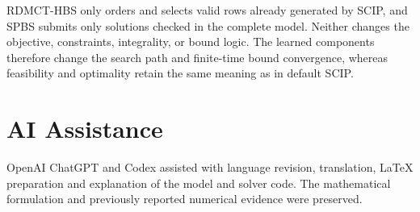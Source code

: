 \documentclass[journal]{IEEEtran}
\newcommand{\method}{RDMCT-HBS}
\begin{document}
\method{} only orders and selects valid rows already generated by SCIP, and SPBS submits only solutions checked in the complete model. Neither changes the objective, constraints, integrality, or bound logic. The learned components therefore change the search path and finite-time bound convergence, whereas feasibility and optimality retain the same meaning as in default SCIP.

\section*{AI Assistance}
OpenAI ChatGPT and Codex assisted with language revision, translation, LaTeX preparation and explanation of the model and solver code. The mathematical formulation and previously reported numerical evidence were preserved.


\end{document}
